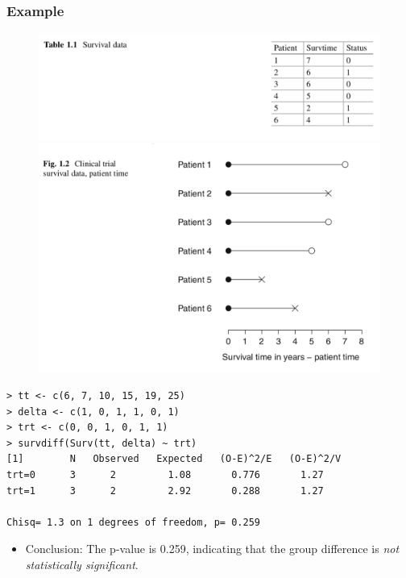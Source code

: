 \documentclass{beamer}
\newcommand{\empr}[1]{{\emph{\color{red}#1}}}
\begin{document}
\pagebreak
\begin{frame}[fragile]
\frametitle{Example}
\begin{figure}[h!]
	\includegraphics[scale = .35]{001.png}
	\includegraphics[scale = .35]{002.png}
\end{figure}
\begin{Verbatim}
> tt <- c(6, 7, 10, 15, 19, 25)
> delta <- c(1, 0, 1, 1, 0, 1)
> trt <- c(0, 0, 1, 0, 1, 1)
> survdiff(Surv(tt, delta) ~ trt)
[1]        N   Observed   Expected   (O-E)^2/E   (O-E)^2/V
trt=0      3      2         1.08       0.776       1.27
trt=1      3      2         2.92       0.288       1.27

Chisq= 1.3 on 1 degrees of freedom, p= 0.259
\end{Verbatim}
\begin{itemize}
\item Conclusion: The p-value is 0.259, indicating that the group difference is \empr{not statistically significant}.
\end{itemize}
\end{frame}
\end{document}
